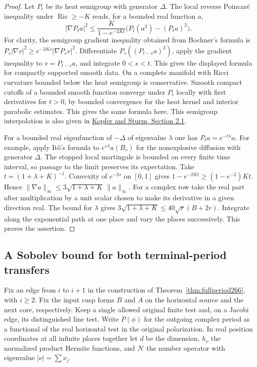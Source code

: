 \documentclass[a4paper,11pt]{article}
\theoremstyle{definition}
\theoremstyle{remark}
\numberwithin{equation}{section}
\begin{document}
\begin{proof}
Let \(P_t\) be its heat semigroup with generator \(\Delta\).
The local reverse Poincar\'e inequality under \(\operatorname{Ric}\ge-K\)
reads, for a bounded real function \(a\),
\[
 |\nabla P_t a|^2\le
   \frac{K}{1-e^{-2Kt}}\big(P_t(a^2)-(P_ta)^2\big).
\]
For clarity, the semigroup gradient inequality obtained from Bochner's
formula is \(P_s|\nabla v|^2\ge e^{-2Ks}|\nabla P_s v|^2\).
Differentiate \(P_s((P_{t-s}a)^2)\), apply the gradient inequality
to \(v=P_{t-s}a\), and integrate \(0<s<t\). This gives the displayed
formula for compactly supported smooth data. On a complete manifold
with Ricci curvature bounded below the heat semigroup is conservative.
Smooth compact cutoffs of a bounded smooth function converge under
\(P_t\) locally with first derivatives for \(t>0\), by bounded
convergence for the heat kernel and interior parabolic estimates.
This gives the same formula here. This semigroup interpolation is also given in
\href{https://doi.org/10.1112/jlms.12452}{Kopfer
and Sturm, Section 2.1}.

For a bounded real eigenfunction of \(-\Delta\) of eigenvalue
\(\lambda\) one has \(P_ta=e^{-t\lambda}a\). For example, apply
It\^o's formula to \(e^{s\lambda}a(B_s)\) for the nonexplosive
diffusion with generator \(\Delta\). The stopped local martingale is
bounded on every finite time interval, so passage to the limit
preserves its expectation. Take \(t=(1+\lambda+K)^{-1}\).
Convexity of \(e^{-2s}\) on \([0,1]\) gives
\(1-e^{-2Kt}\ge (1-e^{-2})Kt\). Hence
\(\|\nabla a\|_\infty\le 3\sqrt{1+\lambda+K}\,\|a\|_\infty\).
For a complex row take the real part after multiplication by a unit
scalar chosen to make its derivative in a given direction real.
The bound for \(\lambda\) gives \(3\sqrt{1+\lambda+K}\le
40\sqrt r(B+2r)\). Integrate along the exponential path at one
place and vary the places successively. This proves the assertion.
\end{proof}

\subsection{A Sobolev bound for both terminal-period transfers}\label{nav:VI-42}
Fix an edge from \(i\) to \(i+1\) in the construction of
Theorem~\ref{thm:fullperiod266}, with \(i\ge2\). Fix the input
cusp forms \(B\) and \(A\) on the horizontal source and the
next core, respectively. Keep a single allowed original
finite test and, on a Jacobi edge, its distinguished line test.
Write \(P(\phi)\) for the outgoing complex period as a
functional of the real horizontal test in the original
polarization. In real position coordinates at all infinite
places together let \(d\) be the dimension, \(h_\nu\) the
normalized product Hermite functions, and \(\mathcal N\) the
number operator with eigenvalue \(|\nu|=\sum\nu_j\).
\end{document}
